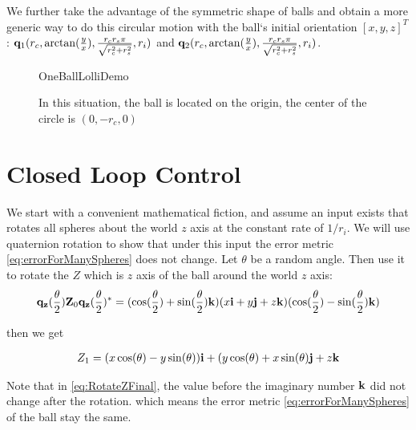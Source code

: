 \documentclass[letter paper, 10pt, conference]{ieeeconf}
\begin{document}
We further take the advantage of the symmetric shape of balls and obtain a more generic way to do this circular motion with the ball`s initial orientation $[x,y,z]^T$: ${\bf q}_1(r_c, \arctan(\frac{y}{x}), \frac{r_cr_s\pi}{\sqrt{r_c^2+r_s^2}}, r_i)$ and ${\bf q}_2(r_c, \arctan(\frac{y}{x}), \frac{r_cr_s\pi}{\sqrt{r_c^2+r_s^2}}, r_i)$.




    \begin{figure}%
	\begin{center}
	\begin{overpic}[width=.9\columnwidth]{OneBallLolliDemo}
	\end{overpic}
	\end{center}
	\vspace{-1em}
	\caption{ \label{fig:OneBallLolliDemo} In this situation, the ball is located on the origin, the center of the circle is $(0,-r_c,0)$
}\vspace{-1em}
\end{figure}



\section{Closed Loop Control}\label{sec:ClosedLoopControl}%

We start with a convenient mathematical fiction, and assume an input exists that rotates all spheres about the world $z$ axis at the constant rate of $1/r_i$.  
We will use quaternion rotation to show that under this input the error metric \eqref{eq:errorForManySpheres} does not change. Let $\theta$ be a random angle. Then use it to rotate the $Z$ which is $z$ axis of the ball around the world $z$ axis:
\begin{align}
{\bf q_z}(\frac{\theta}{2}){\bf Z}_0{\bf q_z}(\frac{\theta}{2})^*=(\cos(\frac{\theta}{2})+\sin(\frac{\theta}{2}){\bf k})(x{\bf i}+y{\bf j}+z{\bf k})(\cos(\frac{\theta}{2})-\sin(\frac{\theta}{2}){\bf k})
\end{align}

then we get

\begin{align}
Z_1=(x\cos(\theta)-y\sin(\theta)){\bf i}+(y\cos(\theta)+x\sin(\theta){\bf j}+z{\bf k}
\label{eq:RotateZFinal}
\end{align}

Note that in \eqref{eq:RotateZFinal}, the value before the imaginary number ${\bf k}$ did not change after the rotation. which means the error metric \eqref{eq:errorForManySpheres} of the ball stay the same.
\end{document}
